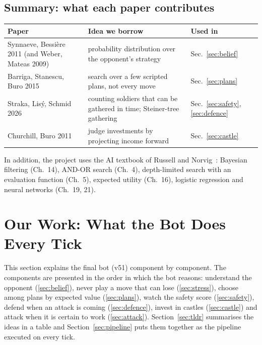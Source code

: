 \subsection{Summary: what each paper contributes}

\begin{center}
\small
\begin{tabularx}{\linewidth}{>{\raggedright}p{4.2cm}X>{\raggedright\arraybackslash}p{2.2cm}}
\toprule
\textbf{Paper} & \textbf{Idea we borrow} & \textbf{Used in}\\
\midrule
Synnaeve, Bessi\`ere 2011 (and Weber, Mateas 2009) & probability distribution over the opponent's strategy & Sec.~\ref{sec:belief}\\
Barriga, Stanescu, Buro 2015 & search over a few scripted plans, not every move & Sec.~\ref{sec:plans}\\
Straka, Lis\'y, Schmid 2026 & counting soldiers that can be gathered in time; Steiner-tree gathering & Sec.~\ref{sec:safety}, \ref{sec:defence}\\
Churchill, Buro 2011 & judge investments by projecting income forward & Sec.~\ref{sec:castle}\\
\bottomrule
\end{tabularx}
\end{center}

In addition, the project uses the AI textbook of Russell and Norvig~\cite{aima}: Bayesian filtering
(Ch.~14), AND-OR search (Ch.~4), depth-limited search with an evaluation function (Ch.~5), expected utility
(Ch.~16), logistic regression and neural networks (Ch.~19, 21).

\section{Our Work: What the Bot Does Every Tick}\label{sec:work}

This section explains the final bot (v51) component by component. The components are presented in the order
in which the bot reasons: understand the opponent (\ref{sec:belief}), never play a move that can lose
(\ref{sec:stress}), choose among plans by expected value (\ref{sec:plans}), watch the safety score
(\ref{sec:safety}), defend when an attack is coming (\ref{sec:defence}), invest in castles (\ref{sec:castle})
and attack when it is certain to work (\ref{sec:attack}). Section~\ref{sec:tldr} summarises the ideas in a
table and Section~\ref{sec:pipeline} puts them together as the pipeline executed on every tick.

